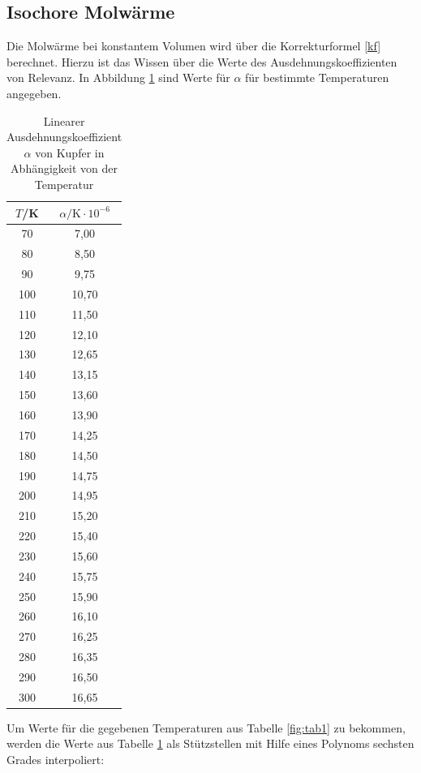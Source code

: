 \subsection{Isochore Molwärme}
Die Molwärme bei konstantem Volumen wird über die Korrekturformel \eqref{kf} berechnet. Hierzu ist das Wissen über die Werte des Ausdehnungskoeffizienten von Relevanz. In Abbildung \ref{fig:tab3} sind Werte für \(\alpha\) für bestimmte Temperaturen angegeben.

\begin{table}[H]
	\begin{center}
		\begin{tabular}{c c}
			\toprule
			\(T\)/K & \(\alpha/\text{K}\cdot10^{-6}\)\\
			\midrule
			70	&7,00\\
			80	&8,50\\
			90	&9,75\\
			100	&10,70\\
			110	&11,50\\
			120	&12,10\\
			130	&12,65\\
			140	&13,15\\
			150	&13,60\\
			160	&13,90\\
			170	&14,25\\
			180	&14,50\\
			190	&14,75\\
			200	&14,95\\
			210	&15,20\\
			220	&15,40\\
			230	&15,60\\
			240	&15,75\\
			250	&15,90\\
			260	&16,10\\
			270	&16,25\\
			280	&16,35\\
			290	&16,50\\
			300	&16,65\\
			\bottomrule
		\end{tabular}
		\caption{Linearer Ausdehnungskoeffizient \(\alpha\) von Kupfer in Abhängigkeit von der Temperatur}
		\label{fig:tab3}
	\end{center}
\end{table}

\noindent Um Werte für die gegebenen Temperaturen aus Tabelle \ref{fig:tab1} zu bekommen, werden die Werte aus Tabelle \ref{fig:tab3} als Stützstellen mit Hilfe eines Polynoms sechsten Grades interpoliert:

